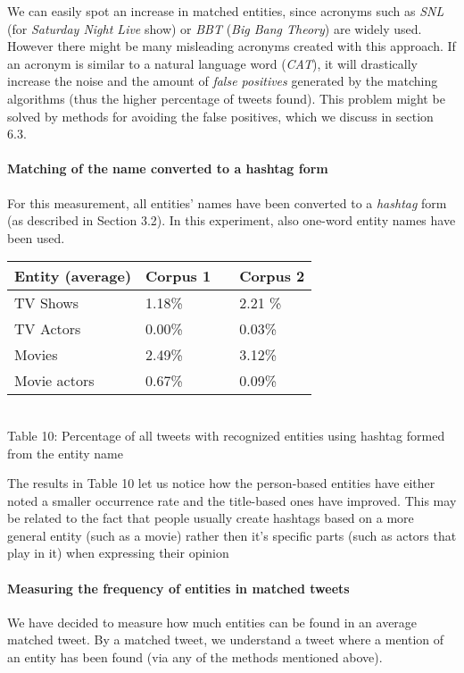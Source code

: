 We can easily spot an increase in matched entities, since acronyms such as \textit{SNL}
(for \textit{Saturday Night Live} show) or \textit{BBT} (\textit{Big Bang Theory}) are widely used.
However there might be many misleading acronyms created with this approach. If an acronym is similar
to a natural language word (\eg \textit{CAT}), it will drastically increase the noise and the amount
of \textit{false positives} generated by the matching algorithms (thus the higher percentage of tweets
found). This problem might be solved by methods for avoiding the false positives, which we discuss in section 6.3.

\paragraph{Matching of the name converted to a hashtag form}
For this measurement, all entities' names have been converted to a \textit{hashtag} form (as described
in Section 3.2). In this experiment, also one-word entity names have been used.

\begin{center}
  \begin{tabular}{ | p{4cm} | p{2cm} | p{1cm}| p{2cm} | } \hline
    Entity (average) & Corpus 1 & & Corpus 2 \\ \hline
    TV Shows & 1.18\% & & 2.21 \% \\ \hline
    TV Actors & 0.00\% & & 0.03\% \\ \hline
    Movies & 2.49\% & & 3.12\% \\ \hline
    Movie actors & 0.67\% & & 0.09\% \\ \hline
  \end{tabular} \\
  Table 10: Percentage of all tweets with recognized entities using hashtag formed from the entity name \\
\end{center}

The results in Table 10 let us notice how the person-based entities have either noted a smaller
occurrence rate and the title-based ones have improved. This may be related to the
fact that people usually create hashtags based on a more general entity (such as
a movie) rather then it's specific parts (such as actors that play in it)
when expressing their opinion \cite{edinburg-corpus}

\paragraph{Measuring the frequency of entities in matched tweets}
We have decided to measure how much entities can be found in an average matched tweet. By a matched tweet,
we understand a tweet where a mention of an entity has been found (via any of the methods mentioned above).

